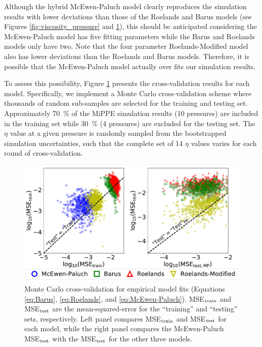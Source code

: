 \documentclass[preprint,review,12pt]{elsarticle}
\begin{document}
	
	Although the hybrid McEwen-Paluch model clearly reproduces the simulation results with lower deviations than those of the Roelands and Barus models (see Figures \ref{fig:viscosity_pressure} and \ref{fig:cross_validation}), this should be anticipated considering the McEwen-Paluch model has five fitting parameters while the Barus and Roelands models only have two. Note that the four parameter Roelands-Modified model also has lower deviations than the Roelands and Barus models. Therefore, it is possible that the McEwen-Paluch model actually over fits our simulation results. 
	
	To assess this possibility, Figure \ref{fig:cross_validation} presents the cross-validation results for each model. Specifically, we implement a Monte Carlo cross-validation scheme where thousands of random sub-samples are selected for the training and testing set. Approximately 70~\% of the MiPPE simulation results (10 pressures) are included in the training set while 30~\% (4 pressures) are excluded for the testing set. The $\eta$ value at a given pressure is randomly sampled from the bootstrapped simulation uncertainties, such that the complete set of 14 $\eta$ values varies for each round of cross-validation.
	
	
	\begin{figure}[htb!]
		\centering
		\includegraphics[width=6.4in]{cross_validation.pdf}
		\caption{Monte Carlo cross-validation for empirical model fits (Equations \ref{eq:Barus}, \ref{eq:Roelands}, and \ref{eq:McEwen-Paluch}). MSE$_{\rm train}$ and MSE$_{\rm test}$ are the mean-squared-error for the ``training'' and ``testing'' sets, respectively. Left panel compares MSE$_{\rm train}$ and MSE$_{\rm test}$ for each model, while the right panel compares the McEwen-Paluch MSE$_{\rm test}$ with the MSE$_{\rm test}$ for the other three models.}
		\label{fig:cross_validation}
	\end{figure}
	
\end{document}
